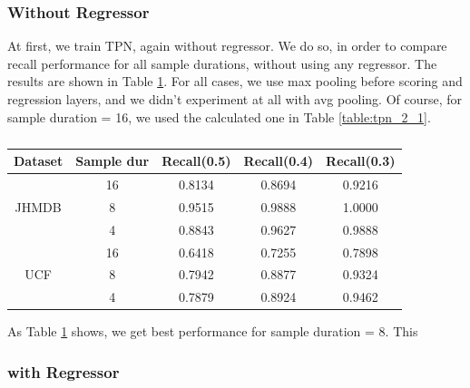 \documentclass{report}
\begin{document}
\subsubsection{Without Regressor}

At first, we train TPN, again without regressor. We do so, in order to compare recall performance for all sample durations, without using any regressor. The results
are shown in Table \ref{table:new_sample}. For all cases, we use max pooling before scoring and regression layers, and we didn't experiment at all with
avg pooling. Of course, for sample duration = 16, we used the calculated one in  Table \ref{table:tpn_2_1}.

\begin{table}[h]
  \centering
  \begin{tabular}{|c | c || c c c|}
    \hline
    \textbf{Dataset} & \textbf{Sample dur} & \textbf{Recall(0.5)} &  \textbf{Recall(0.4)} &  \textbf{Recall(0.3)} \\
    \hline
    \multirow{3}{*}{JHMDB} & 16 & 0.8134 & 0.8694 & 0.9216 \\
    \cline{2-5}
    {} & 8 & 0.9515 & 0.9888 & 1.0000 \\
    \cline{2-5}
    {} & 4 & 0.8843 & 0.9627 & 0.9888 \\
    \hline
    \multirow{3}{*}{UCF} & 16 & 0.6418 & 0.7255 & 0.7898 \\
    \cline{2-5}
    {} & 8 & 0.7942 & 0.8877 & 0.9324\\
    \cline{2-5}
    {} & 4 & 0.7879 & 0.8924 & 0.9462 \\
    \hline
    
  \end{tabular}
  \caption{}
  \label{table:new_sample}
\end{table}

As Table \ref{table:new_sample} shows, we get best performance for sample duration = 8. This 
\subsubsection{with Regressor}                                             
\end{document}
